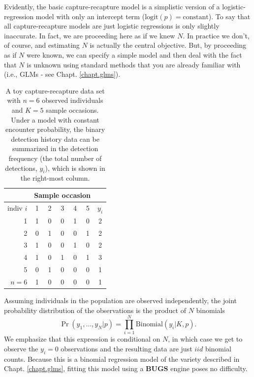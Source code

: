 Evidently, the basic capture-recapture model is a simplistic version
of a logistic-regression model with only an intercept term
($\mbox{logit}(p) = \mbox{constant}$).  To say that all
capture-recapture models are just logistic regressions is only
slightly inaccurate. In fact, we are proceeding here as if we knew
$N$.  In practice we don't, of course, and estimating $N$ is actually
the central objective.  But, by proceeding as if $N$ were known, we
can specify a simple model and then deal with the fact that $N$ is
unknown using standard methods that you are already familiar with
(i.e., GLMs - see Chapt. \ref{chapt.glms}).
\begin{table}[ht]
\centering
\caption{A toy capture-recapture data set with $n=6$ observed
  individuals and $K=5$ sample occasions. Under a model with constant encounter
  probability, the binary detection history data can be summarized in the detection frequency (the total number of detections, $y_i$), which is shown in the right-most column.
}
\begin{tabular}{r|ccccc|c}
\hline
&  \multicolumn{5}{c}{Sample occasion} &  \\ \hline
 indiv $i$ &  1 & 2 & 3 & 4 & 5 & $y_{i}$ \\ \hline
  1 &     1 & 0 & 0 & 1 & 0  & 2   \\
  2 &     0 & 1 & 0 & 0 & 1  & 2   \\
  3 &     1 & 0 & 0 & 1 & 0  & 2   \\
  4 &     1 & 0 & 1 & 0 & 1  & 3   \\
  5 &     0 & 1 & 0 & 0 & 0  & 1   \\
  $n=6$ & 1 & 0 & 0 & 0 & 0  & 1   \\ \hline
\end{tabular}
\label{closed.tab.3.1}
\end{table}


Assuming individuals in the population are observed independently, the
joint probability distribution of the observations is the product of
$N$ binomials
\begin{equation}
  \Pr(y_1, \ldots, y_N | p) = \prod_{i=1}^N  \mathrm{Binomial}(y_i | K, p).
  \label{closed.eq.binNknown}
\end{equation}
We emphasize that this expression is conditional on $N$, in which
case we get to observe the $y_i=0$ observations and the resulting data
are just $iid$ binomial counts. Because this is a binomial regression
model of the variety described in Chapt. \ref{chapt.glms}, fitting this model using
a {\bf BUGS} engine poses no difficulty.

